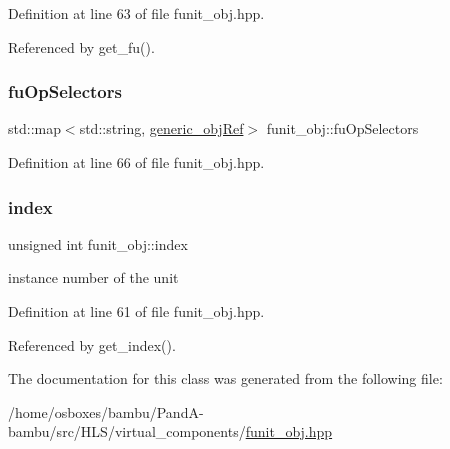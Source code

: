Definition at line 63 of file funit\+\_\+obj.\+hpp.



Referenced by get\+\_\+fu().

\mbox{\label{classfunit__obj_ad90a1f58ef6389e0e1fcf2619fc54ce8}} 
\subsubsection{\texorpdfstring{fu\+Op\+Selectors}{fuOpSelectors}}
{\footnotesize\ttfamily std\+::map$<$std\+::string, \hyperlink{generic__obj_8hpp_acb533b2ef8e0fe72e09a04d20904ca81}{generic\+\_\+obj\+Ref}$>$ funit\+\_\+obj\+::fu\+Op\+Selectors\hspace{0.3cm}{\ttfamily [private]}}



Definition at line 66 of file funit\+\_\+obj.\+hpp.

\mbox{\label{classfunit__obj_a085b6db5c30586a80109c3e520ac31f8}} 
\subsubsection{\texorpdfstring{index}{index}}
{\footnotesize\ttfamily unsigned int funit\+\_\+obj\+::index\hspace{0.3cm}{\ttfamily [private]}}



instance number of the unit 



Definition at line 61 of file funit\+\_\+obj.\+hpp.



Referenced by get\+\_\+index().



The documentation for this class was generated from the following file\+:\begin{DoxyCompactItemize}
\item 
/home/osboxes/bambu/\+Pand\+A-\/bambu/src/\+H\+L\+S/virtual\+\_\+components/\hyperlink{funit__obj_8hpp}{funit\+\_\+obj.\+hpp}\end{DoxyCompactItemize}
